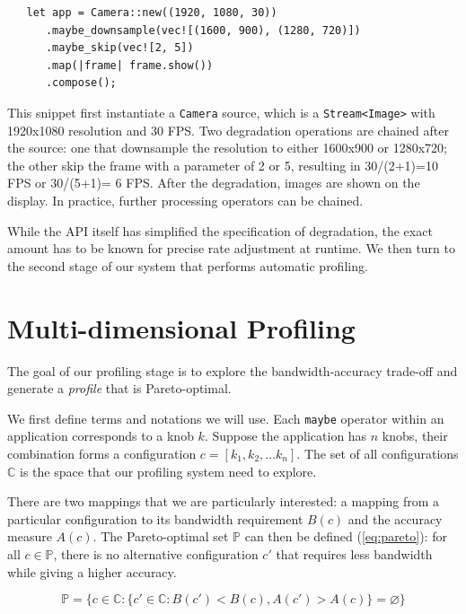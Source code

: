\begin{lstlisting}
   let app = Camera::new((1920, 1080, 30))
      .maybe_downsample(vec![(1600, 900), (1280, 720)])
      .maybe_skip(vec![2, 5])
      .map(|frame| frame.show())
      .compose();
\end{lstlisting}

This snippet first instantiate a \texttt{Camera} source, which is a
\texttt{Stream<Image>} with 1920x1080 resolution and 30 FPS. Two degradation
operations are chained after the source: one that downsample the resolution to
either 1600x900 or 1280x720; the other skip the frame with a parameter of 2 or
5, resulting in 30/(2+1)=10 FPS or 30/(5+1)= 6 FPS. After the degradation,
images are shown on the display. In practice, further processing operators can
be chained.

While the API itself has simplified the specification of degradation, the exact
amount has to be known for precise rate adjustment at runtime. We then turn to
the second stage of our system that performs automatic profiling.

\section{Multi-dimensional Profiling}
\label{sec:profiling}

The goal of our profiling stage is to explore the bandwidth-accuracy trade-off
and generate a \textit{profile} that is Pareto-optimal.

We first define terms and notations we will use. Each \texttt{maybe} operator
within an application corresponds to a knob $k$. Suppose the application has $n$
knobs, their combination forms a configuration $c = [k_{1}, k_{2},
... k_{n}]$. The set of all configurations $\mathbb{C}$ is the space that our
profiling system need to explore.

There are two mappings that we are particularly interested: a mapping from a
particular configuration to its bandwidth requirement $B(c)$ and the accuracy
measure $A(c)$. The Pareto-optimal set $\mathbb{P}$ can then be defined
(\autoref{eq:pareto}): for all $c \in \mathbb{P}$, there is no alternative
configuration $c'$ that requires less bandwidth while giving a higher accuracy.

{\small
\begin{equation}
  \mathbb{P} = \{ c \in \mathbb{C} : \{ c' \in \mathbb{C}: B(c') < B(c),
  A(c') > A(c) \} = \varnothing\}
  \label{eq:pareto}
\end{equation}
}%

